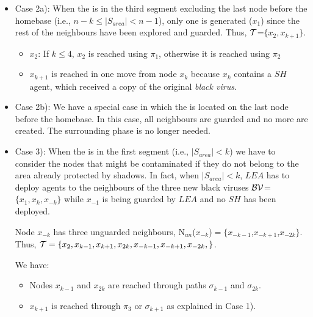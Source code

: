\begin{itemize}
\begin{itemize}

\end{itemize}

 \item Case 2a): When the \bv is in the third   segment excluding the last node before the homebase
 (i.e.,   $n-k\leq |S_{area}| <n-1$), only  one \bv is generated ($x_1$) since the rest of the neighbours have been explored and guarded. Thus,
$\cal T$=$\{x_2,x_{k+1}\}$.
\begin{itemize}
\item $x_2$: 
 If  $k \leq4$,  $x_2$ is reached using $\pi_1$, otherwise  it is reached using $\pi_2$ \\
\item $x_{k+1}$ is reached in one move  from node $x_{k}$ because $x_{k}$ contains a $SH$ agent, which received a copy of the original {\it black virus}.  
\end{itemize}
\item  Case 2b): We have a special case in which the \bv is located  on the last node before the homebase. In this case, all neighbours are guarded and no more \bvs are created. The surrounding phase is no longer needed.

\item Case 3):  When the \bv is in the first  segment  (i.e., $\left\vert{S_{area}}\right\vert < k$) 
 we have to  consider the nodes that might be contaminated  if they do not belong to the  area already protected by shadows.
In fact, when $\left\vert{S_{area}}\right\vert < k$, $LEA$ has to deploy agents to the neighbours of the three new black viruses $\cal BV$=$\{x_1,x_k,x_{-k}\}$ while $x_{-1}$ is being guarded by $LEA$ and no $SH$ has been deployed.


Node  $x_{-k}$ has three unguarded neighbours, N$_{un}$($x_{-k}$)$=\{x_{-k-1}$,$x_{-k+1}$,$x_{-2k}\}$.
Thus, ${\cal T} = \{x_{2},x_{k-1},x_{k+1},x_{2k},x_{-k-1},x_{-k+1},x_{-2k},\}$.


We have:
\begin{itemize}
\item Nodes $x_{k-1}$ and $x_{2k} $ are reached through paths $\sigma_{k-1}$ and $\sigma_{2k}$.
\item $x_{k+1}$ is reached through $\pi_3$ or $\sigma_{k+1}$ as   explained in Case 1).



\end{itemize}
\end{itemize}
